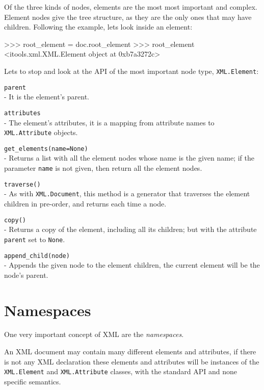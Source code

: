 Of the three kinds of nodes, elements are the most most important and complex.
Element nodes give the tree structure, as they are the only ones that may have
children. Following the example, lets look inside an element:

\begin{code}
    >>> root_element = doc.root_element
    >>> root_element
    <itools.xml.XML.Element object at 0xb7a3272c>
\end{code}



Lets to stop and look at the API of the most important node type,
{\tt XML.Element}:

\begin{api}
    {\tt parent}\\
    - It is the element's parent.

    {\tt attributes}\\
    - The element's attributes, it is a mapping from attribute names to
    {\tt XML.Attribute} objects.

    {\tt get\_elements(name=None)}\\
    - Returns a list with all the element nodes whose name is the given
    name; if the parameter {\tt name} is not given, then return all the
    element nodes.

    {\tt traverse()}\\
    - As with {\tt XML.Document}, this method is a generator that traverses
    the element children in pre-order, and returns each time a node.

    {\tt copy()}\\
    - Returns a copy of the element, including all its children; but with
    the attribute {\tt parent} set to {\tt None}.

    {\tt append\_child(node)}\\
    - Appends the given node to the element children, the current element will
    be the node's parent.
\end{api}


\section{Namespaces}

One very important concept of XML are the {\em namespaces}.

An XML document may contain many different elements and attributes, if there
is not any XML declaration these elements and attributes will be instances
of the {\tt XML.Element} and {\tt XML.Attribute} classes, with the standard
API and none specific semantics.

